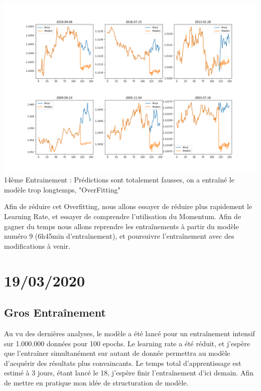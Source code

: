 \documentclass[12pt,a4paper]{article}
\begin{document}
\begin{center}
\includegraphics[scale=0.25,trim={0 2cm 0 0},clip]{14-2020-03-18.png} 
\\14ème Entrainement : Prédictions sont totalement fausses, on a entraîné le modèle trop longtemps, "OverFitting"
\end{center}

Afin de réduire cet Overfitting, nous allons essayer de réduire plus rapidement le Learning Rate, et essayer de comprendre l'utilisation du Momentum. Afin de gagner du temps nous allons reprendre les entraînements à partir du modèle numéro 9 (6h45min d'entraînement), et poursuivre l'entraînement avec des modifications à venir.

 
\newpage
\section*{19/03/2020}
\subsection*{Gros Entraînement}
Au vu des dernières analyses, le modèle a été lancé pour un entraînement intensif sur 1.000.000 données pour 100 epochs. Le learning rate a été réduit, et j'espère que l'entraîner simultanément sur autant de donnée permettra au modèle d'acquérir des résultats plus convaincants. Le temps total d'apprentissage est estimé à 3 jours, étant lancé le 18, j'espère finir l'entraînement d'ici demain. Afin de mettre en pratique mon idée de structuration de modèle.
\end{document}
